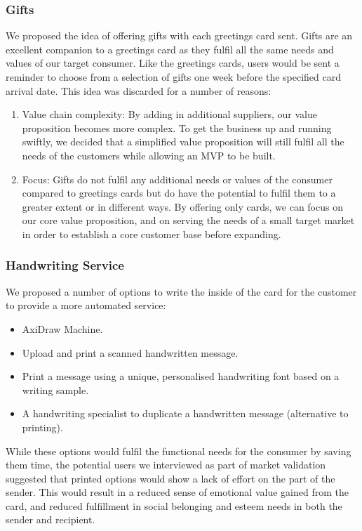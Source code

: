\documentclass[10pt, a4paper]{article}
\begin{document}
\subsubsection*{Gifts}
We proposed the idea of offering gifts with each greetings card sent. Gifts are an excellent companion to a greetings card as they fulfil all the same needs and values of our target consumer. Like the greetings cards, users would be sent a reminder to choose from a selection of gifts one week before the specified card arrival date.
This idea was discarded for a number of reasons:
\begin{enumerate}
  \item Value chain complexity: By adding in additional suppliers, our value proposition becomes more complex. To get the business up and running swiftly, we decided that a simplified value proposition will still fulfil all the needs of the customers while allowing an MVP to be built.
  \item Focus: Gifts do not fulfil any additional needs or values of the consumer compared to greetings cards but do have the potential to fulfil them to a greater extent or in different ways. By offering only cards, we can focus on our core value proposition, and on serving the needs of a small target market in order to establish a core customer base before expanding.
\end{enumerate}

\subsubsection*{Handwriting Service}
We proposed a number of options to write the inside of the card for the customer to provide a more automated service:
\begin{itemize}
  \item AxiDraw Machine.
  \item Upload and print a scanned handwritten message.
  \item Print a message using a unique, personalised handwriting font based on a writing sample.
  \item A handwriting specialist to duplicate a handwritten message (alternative to printing).
\end{itemize}

While these options would fulfil the functional needs for the consumer by saving them time, the potential users we interviewed as part of market validation suggested that printed options would show a lack of effort on the part of the sender. This would result in a reduced sense of emotional value gained from the card, and reduced fulfillment in social belonging and esteem needs in both the sender and recipient.
\end{document}
